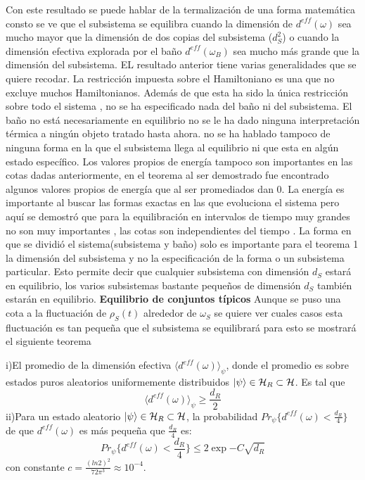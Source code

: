 Con este resultado se puede hablar de la termalización de una forma matemática consto se ve que el subsistema se equilibra cuando la dimensión de $d^{eff}(\omega)$ sea mucho mayor que la dimensión de dos copias del subsistema ($d_{S}^{2}$) o cuando la dimensión efectiva explorada por el baño $d^{eff}(\omega_{B})$ sea mucho más grande que la dimensión del subsistema.
EL resultado anterior tiene varias generalidades que se quiere recodar. La restricción impuesta sobre el Hamiltoniano  es una que no excluye muchos Hamiltonianos. Además de que esta ha sido la única restricción sobre todo el sistema , no se ha especificado nada del baño ni del subsistema. El baño no está necesariamente en equilibrio no se le ha dado ninguna interpretación térmica a ningún objeto tratado hasta ahora. no se ha hablado tampoco de ninguna forma en la que el subsistema llega al equilibrio ni que esta en algún estado específico.
Los valores propios de energía tampoco son importantes en las cotas dadas anteriormente, en el teorema al ser demostrado fue encontrado algunos valores propios de energía que al ser promediados dan 0. La energía es importante al buscar las formas exactas en las que evoluciona el sistema pero aquí se demostró que para la equilibración en intervalos de tiempo muy grandes no son muy importantes , las cotas son independientes del tiempo . La forma en que se dividió el sistema(subsistema y baño) solo es importante para el teorema 1 la dimensión del subsistema y no la especificación de la forma o un subsistema particular. Esto permite decir que cualquier subsistema con dimensión $d_{S}$ estará en equilibrio, los varios subsistemas bastante pequeños de dimensión $d_{S}$ también estarán en equilibrio.
\textbf{Equilibrio de conjuntos típicos}
Aunque se puso una cota a la fluctuación de $\rho_{S}(t)$ alrededor de $\omega_{S}$ se quiere ver cuales casos esta fluctuación es tan pequeña que el subsistema se equilibrará para esto se mostrará el siguiente teorema\\

\begin{theorem}
i)El promedio de la dimensión efectiva $\langle d^{eff}(\omega) \rangle_{\psi}$, donde el promedio es sobre estados puros aleatorios uniformemente distribuidos $\ket{\psi} \in \mathcal{H}_{R} \subset \mathcal{H}$. Es tal que 
\begin{equation}
\langle d^{eff}(\omega) \rangle_{\psi} \ge \frac{d_{R}}{2}
\end{equation}
ii)Para un estado aleatorio $\ket{\psi} \in \mathcal{H}_{R} \subset \mathcal{H}$, la probabilidad $Pr_{\psi} \{ d^{eff}(\omega) < \frac{d_{R}}{4}  \}$ de que $d^{eff}(\omega)$ es más pequeña que $\frac{d_{R}}{4}$ es:
\begin{equation}
Pr_{\psi} \{ d^{eff}(\omega) < \frac{d_{R}}{4}  \} \leq 2 \exp{-C \sqrt{d_{R}}}
\end{equation}
con constante $c= \frac{(ln 2)^{2}}{72 \pi^{3}} \approx 10^{-4}$.
\end{theorem}

